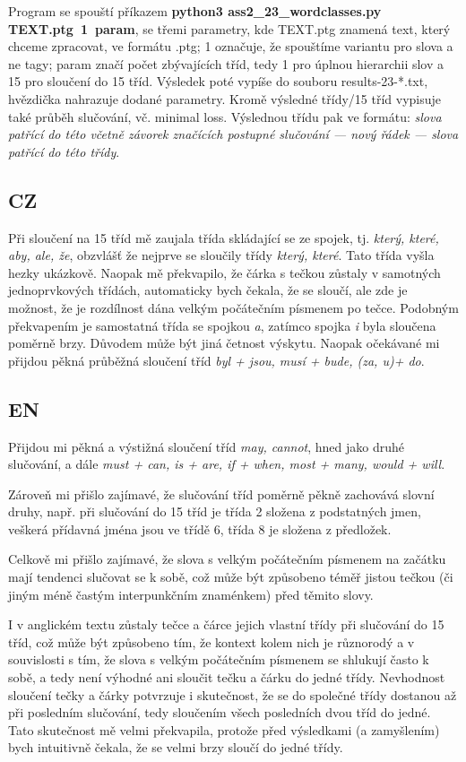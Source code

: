 \documentclass[12pt, a4paper]{report}
\theoremstyle{remark}
\begin{document}
Program se spouští příkazem {\bf python3 ass2\_23\_wordclasses.py TEXT.ptg~1~param}, se třemi parametry, kde TEXT.ptg znamená text, který chceme zpracovat, ve formátu .ptg; 1 označuje, že spouštíme variantu pro slova a ne tagy; param značí počet zbývajících tříd, tedy 1 pro úplnou hierarchii slov a 15 pro sloučení do 15 tříd. 
Výsledek poté vypíše do souboru results-23-*.txt, hvězdička nahrazuje dodané parametry. Kromě výsledné třídy/15 tříd vypisuje také průběh slučování, vč. minimal loss. Výslednou třídu pak ve formátu: {\it slova patřící do této včetně závorek značících postupné slučování --- nový řádek --- slova patřící do této třídy}.

\subsection*{CZ}
Při sloučení na 15 tříd mě zaujala třída skládající se ze spojek, tj. {\it  který, které, aby, ale, že}, obzvlášť že nejprve se sloučily třídy {\it který, které}. Tato třída vyšla hezky ukázkově. Naopak mě překvapilo, že čárka s tečkou zůstaly v samotných jednoprvkových třídách, automaticky bych čekala, že se sloučí, ale zde je možnost, že je rozdílnost dána velkým počátečním písmenem po tečce. Podobným překvapením je samostatná třída se spojkou {\it a}, zatímco spojka {\it i} byla sloučena poměrně brzy. Důvodem může být jiná četnost výskytu. Naopak očekávané mi přijdou pěkná průběžná sloučení tříd {\it byl + jsou, musí + bude, (za, u)+ do}.


\subsection*{EN}

Přijdou mi pěkná a výstižná sloučení tříd {\it may, cannot}, hned jako druhé slučování,  a dále  {\it must + can, is + are, if + when, most + many, would + will}.

Zároveň mi přišlo zajímavé, že slučování tříd poměrně pěkně zachovává slovní druhy, např. při slučování do 15 tříd je třída 2 složena  z podstatných jmen, veškerá přídavná jména jsou ve třídě 6, třída 8 je složena z předložek.

Celkově mi přišlo zajímavé, že slova s velkým počátečním písmenem na začátku mají tendenci slučovat se k sobě, což může být způsobeno téměř jistou tečkou (či jiným méně častým interpunkčním znaménkem) před těmito slovy.

I v anglickém textu zůstaly tečce a čárce jejich vlastní třídy při slučování do 15 tříd, což může být způsobeno tím, že kontext kolem nich je různorodý a v souvislosti s tím, že slova s velkým počátečním písmenem se shlukují často k sobě, a tedy není výhodné ani sloučit tečku a čárku do jedné třídy. Nevhodnost sloučení tečky a čárky potvrzuje i skutečnost, že se do společné třídy dostanou až při posledním slučování, tedy sloučením všech posledních dvou tříd do jedné. Tato skutečnost mě velmi překvapila, protože před výsledkami (a zamyšlením) bych intuitivně čekala, že se velmi brzy sloučí do jedné třídy.
\end{document}
